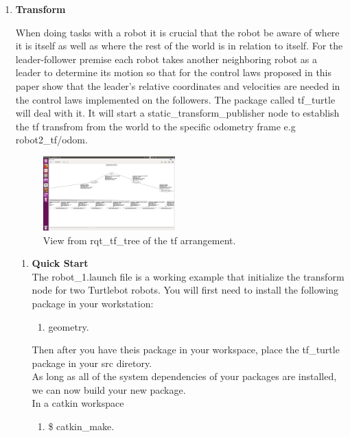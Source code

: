 \documentclass[journal]{IEEEtran}
\begin{document}
\begin{enumerate}
\begin{enumerate}
\end{enumerate}



\item \textbf {Transform}

When doing tasks with a robot it is crucial that the robot be
aware of where it is itself as well as where the rest of the world
is in relation to itself. For the leader-follower premise each robot takes another neighboring robot as a leader to determine its motion so that for the control laws proposed in this paper show that the leader’s relative coordinates and velocities are needed in the control laws implemented on the followers. The package called tf{\_}turtle will deal with it. It will start a static{\_}transform{\_}publisher node to establish the tf transfrom from the world to the specific odometry frame e.g robot2{\_}tf/odom.

\begin{figure}[!h]
\begin{center}
\includegraphics[width=2in]{3.png}
\caption{View from rqt{\_}tf{\_}tree of the tf arrangement.}
\end{center}
\label{fig:mypicture4}
\end{figure}


\begin{enumerate}
\item \textbf {Quick Start}\\
The robot{\_}1.launch file is a working example that initialize the transform node for two Turtlebot robots.
You will first need to install the following package in your workstation:
\begin{enumerate}
\item {geometry}\cite{temp10}.

\end{enumerate}

Then after you have theis package in your workspace, place the tf{\_}turtle\cite{temp11} package in your src diretory.\\
As long as all of the system dependencies of your packages are installed, we can now build your new package.\\
In a catkin workspace
\begin{enumerate} 
\item {{\$} catkin{\_}make}.
\end{enumerate}


\end{enumerate}
\end{enumerate}
\end{document}
